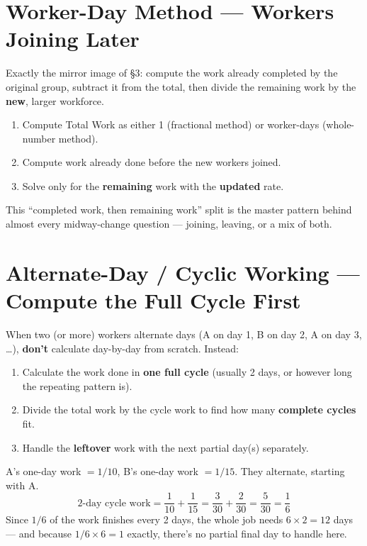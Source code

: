 \documentclass[11pt]{article}
\begin{document}
\section{Worker-Day Method --- Workers Joining Later}
Exactly the mirror image of \S3: compute the work already completed by the original group, subtract
it from the total, then divide the remaining work by the \textbf{new}, larger workforce.

\begin{formulabox}
\begin{enumerate}[leftmargin=1.4em]
  \item Compute Total Work as either 1 (fractional method) or worker-days (whole-number method).
  \item Compute work already done before the new workers joined.
  \item Solve only for the \textbf{remaining} work with the \textbf{updated} rate.
\end{enumerate}
\end{formulabox}

This ``completed work, then remaining work'' split is the master pattern behind almost every
midway-change question --- joining, leaving, or a mix of both.

\section{Alternate-Day / Cyclic Working --- Compute the Full Cycle First}
When two (or more) workers alternate days (A on day 1, B on day 2, A on day 3, \ldots),
\textbf{don't} calculate day-by-day from scratch. Instead:

\begin{formulabox}[Procedure]
\begin{enumerate}[leftmargin=1.4em]
  \item Calculate the work done in \textbf{one full cycle} (usually 2 days, or however long the
    repeating pattern is).
  \item Divide the total work by the cycle work to find how many \textbf{complete cycles} fit.
  \item Handle the \textbf{leftover} work with the next partial day(s) separately.
\end{enumerate}
\end{formulabox}

\begin{examplebox}
A's one-day work $=1/10$, B's one-day work $=1/15$. They alternate, starting with A.
\[
\text{2-day cycle work} = \frac{1}{10} + \frac{1}{15} = \frac{3}{30} + \frac{2}{30} = \frac{5}{30} =
\frac{1}{6}
\]
Since $1/6$ of the work finishes every 2 days, the whole job needs $6 \times 2 = 12$ days --- and
because $1/6 \times 6 = 1$ exactly, there's no partial final day to handle here.
\end{examplebox}
\end{document}

